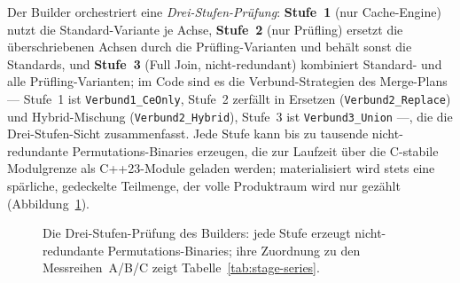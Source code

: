 \begin{nurlang}
Der Builder orchestriert eine \emph{Drei-Stufen-Prüfung}: \textbf{Stufe~1} (nur Cache-Engine) nutzt die
Standard-Variante je Achse, \textbf{Stufe~2} (nur Prüfling) ersetzt die überschriebenen Achsen durch die
Prüfling-Varianten und behält sonst die Standards, und \textbf{Stufe~3} (Full Join, nicht-redundant)
kombiniert Standard- und alle Prüfling-Varianten; im Code sind es die Verbund-Strategien des Merge-Plans
--- Stufe~1 ist \texttt{Verbund1\_CeOnly}, Stufe~2 zerfällt in Ersetzen (\texttt{Verbund2\_Replace}) und
Hybrid-Mischung (\texttt{Verbund2\_Hybrid}), Stufe~3 ist \texttt{Verbund3\_Union} ---, die die
Drei-Stufen-Sicht zusammenfasst. Jede Stufe kann bis zu tausende nicht-redundante
Permutations-Binaries erzeugen, die zur Laufzeit über die C-stabile Modulgrenze als C++23-Module geladen
werden; materialisiert wird stets eine spärliche, gedeckelte Teilmenge, der volle Produktraum wird nur
gezählt (Abbildung~\ref{fig:three-stage}).

\begin{figure}[!htbp]
  \centering
  \caption{Die Drei-Stufen-Prüfung des Builders: jede Stufe erzeugt nicht-redundante
  Permutations-Binaries; ihre Zuordnung zu den Messreihen~A/B/C zeigt
  Tabelle~\ref{tab:stage-series}.}\label{fig:three-stage}
\end{figure}


\end{nurlang}
